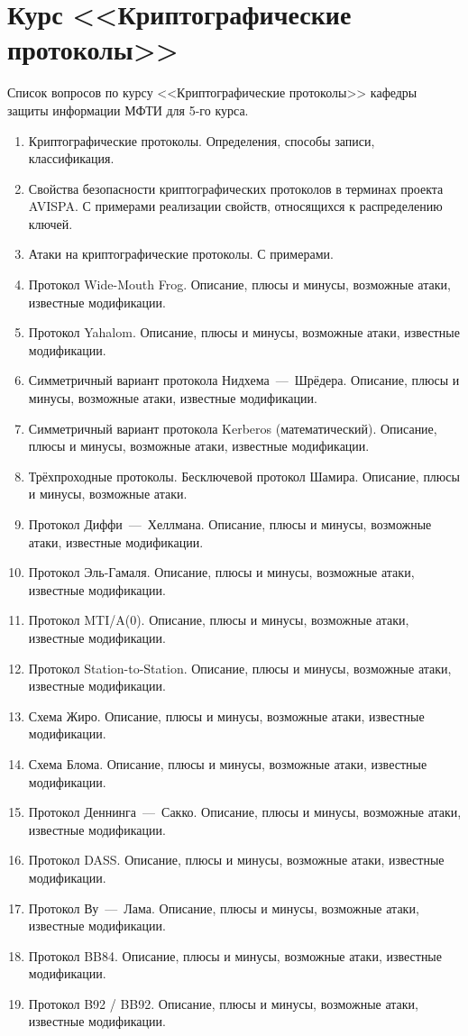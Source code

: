 \section{Курс <<Криптографические протоколы>>}

Список вопросов по курсу <<Криптографические протоколы>> кафедры защиты информации МФТИ для 5-го курса.

\begin{enumerate}
    \item Криптографические протоколы. Определения, способы записи, классификация.
    \item Свойства безопасности криптографических протоколов в терминах проекта AVISPA. С примерами реализации свойств, относящихся к распределению ключей.
    \item Атаки на криптографические протоколы. С примерами.

    \item Протокол Wide-Mouth Frog. Описание, плюсы и минусы, возможные атаки, известные модификации.
    \item Протокол Yahalom. Описание, плюсы и минусы, возможные атаки, известные модификации.
    \item Симметричный вариант протокола Нидхема~---~Шрёдера. Описание, плюсы и минусы, возможные атаки, известные модификации.
    \item Симметричный вариант протокола Kerberos (математический). Описание, плюсы и минусы, возможные атаки, известные модификации.
    \item Трёхпроходные протоколы. Бесключевой протокол Шамира. Описание, плюсы и минусы, возможные атаки.
    \item Протокол Диффи~---~Хеллмана. Описание, плюсы и минусы, возможные атаки, известные модификации.
    \item Протокол Эль-Гамаля. Описание, плюсы и минусы, возможные атаки, известные модификации.
    \item Протокол MTI/A(0). Описание, плюсы и минусы, возможные атаки, известные модификации.
    \item Протокол Station-to-Station. Описание, плюсы и минусы, возможные атаки, известные модификации.
    \item Схема Жиро. Описание, плюсы и минусы, возможные атаки, известные модификации.
    \item Схема Блома. Описание, плюсы и минусы, возможные атаки, известные модификации.
    \item Протокол Деннинга~---~Сакко. Описание, плюсы и минусы, возможные атаки, известные модификации.
    \item Протокол DASS. Описание, плюсы и минусы, возможные атаки, известные модификации.
    \item Протокол Ву~---~Лама. Описание, плюсы и минусы, возможные атаки, известные модификации.
    \item Протокол BB84. Описание, плюсы и минусы, возможные атаки, известные модификации.
    \item Протокол B92 / BB92. Описание, плюсы и минусы, возможные атаки, известные модификации.


\end{enumerate}
